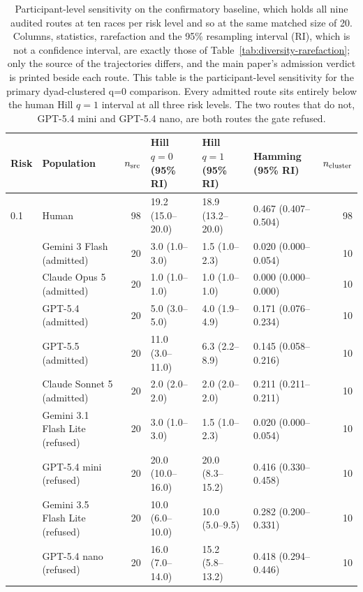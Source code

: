 \documentclass{article}
\begin{document}
\begin{table}[t]
    \caption{Participant-level sensitivity on the confirmatory baseline, which holds all
    nine audited routes at ten races per risk level and so at the same matched
    size of 20. Columns, statistics, rarefaction and the 95\% resampling
    interval (RI), which is not a confidence interval, are exactly those
    of Table~\ref{tab:diversity-rarefaction}; only the source of the
    trajectories differs, and the main paper's admission verdict is printed
    beside each route. This table is the participant-level sensitivity for the
    primary dyad-clustered q{=}0 comparison. Every admitted route sits entirely
    below the human Hill $q{=}1$ interval at all three risk levels. The two
    routes that do not, GPT-5.4 mini and GPT-5.4 nano, are both routes the gate
    refused.}
    \label{tab:diversity-confirmatory}
    \centering
    \footnotesize
    \setlength{\tabcolsep}{5pt}
    \begin{tabular}{@{}llrlllr@{}}
        \toprule
        Risk & Population & $n_{\rm src}$ & Hill $q{=}0$ (95\% RI)
        & Hill $q{=}1$ (95\% RI) & Hamming (95\% RI) & $n_{\rm cluster}$ \\
        \midrule
        0.1 & Human & 98 & 19.2 (15.0--20.0) & 18.9 (13.2--20.0) & 0.467 (0.407--0.504) & 98 \\
         & Gemini 3 Flash (admitted) & 20 & 3.0 (1.0--3.0) & 1.5 (1.0--2.3) & 0.020 (0.000--0.054) & 10 \\
         & Claude Opus 5 (admitted) & 20 & 1.0 (1.0--1.0) & 1.0 (1.0--1.0) & 0.000 (0.000--0.000) & 10 \\
         & GPT-5.4 (admitted) & 20 & 5.0 (3.0--5.0) & 4.0 (1.9--4.9) & 0.171 (0.076--0.234) & 10 \\
         & GPT-5.5 (admitted) & 20 & 11.0 (3.0--11.0) & 6.3 (2.2--8.9) & 0.145 (0.058--0.216) & 10 \\
         & Claude Sonnet 5 (admitted) & 20 & 2.0 (2.0--2.0) & 2.0 (2.0--2.0) & 0.211 (0.211--0.211) & 10 \\
         & Gemini 3.1 Flash Lite (refused) & 20 & 3.0 (1.0--3.0) & 1.5 (1.0--2.3) & 0.020 (0.000--0.054) & 10 \\
         & GPT-5.4 mini (refused) & 20 & 20.0 (10.0--16.0) & 20.0 (8.3--15.2) & 0.416 (0.330--0.458) & 10 \\
         & Gemini 3.5 Flash Lite (refused) & 20 & 10.0 (6.0--10.0) & 10.0 (5.0--9.5) & 0.282 (0.200--0.331) & 10 \\
         & GPT-5.4 nano (refused) & 20 & 16.0 (7.0--14.0) & 15.2 (5.8--13.2) & 0.418 (0.294--0.446) & 10 \\

\end{tabular}
\end{table}
\end{document}
